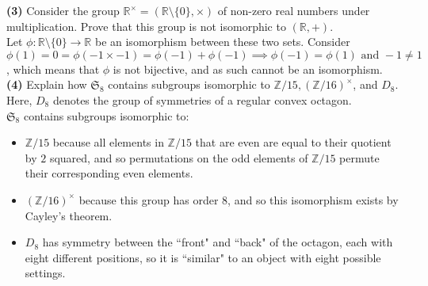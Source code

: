 \documentclass[12pt,letterpaper]{article}
\begin{document}
\textbf{(3)} Consider the group \(\mathbb{R}^{\times} = (\mathbb{R}\setminus \{0\}, \times)\) of non-zero real numbers under multiplication. Prove that this group is not isomorphic to \((\mathbb{R}, +)\). \\

Let \(\phi : \mathbb{R}\setminus \{0\} \to \mathbb{R}\) be an isomorphism between these two sets. Consider \(\phi(1) = 0 = \phi(-1 \times -1) = \phi(-1) + \phi(-1) \implies \phi(-1) = \phi(1) \text{ and } -1 \neq 1\), which means that \(\phi\) is not bijective, and as such cannot be an isomorphism. \\

\textbf{(4)} Explain how \(\mathfrak{S}_{8}\) contains subgroups isomorphic to \(\mathbb{Z}/15, (\mathbb{Z}/16)^{\times}\), and \(D_{8}\). Here, \(D_{8}\) denotes the group of symmetries of a regular convex octagon. \\ 

\(\mathfrak{S}_{8}\)  contains subgroups isomorphic to:

\begin{itemize}
	\item \(\mathbb{Z}/15\) because all elements in \(\mathbb{Z}/15\) that are even are equal to their quotient by \(2\) squared, and so permutations on the odd elements of \(\mathbb{Z}/15\) permute their corresponding even elements. 
	\item \((\mathbb{Z}/16)^{\times}\) because this group has order \(8\), and so this isomorphism exists by Cayley's theorem.
	\item \(D_{8}\) has symmetry between the ``front" and ``back" of the octagon, each with eight different positions, so it is ``similar" to an object with eight possible settings.
\end{itemize}
\end{document}
